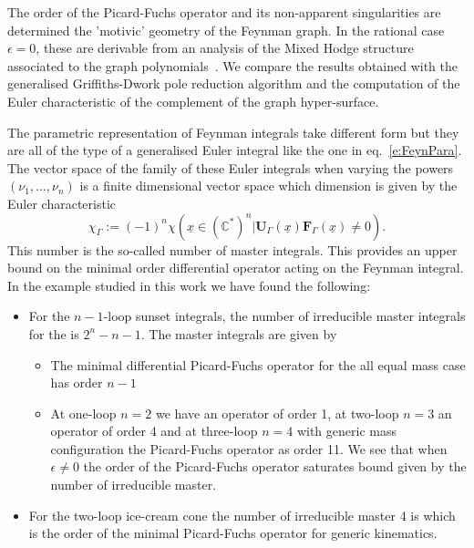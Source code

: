 \documentclass[a4paper,12pt]{article}
\numberwithin{equation}{section}
\numberwithin{figure}{section}
\begin{document}
The order of the Picard-Fuchs operator and its non-apparent
singularities are determined  the 'motivic' geometry of the Feynman
graph. In the rational case $\epsilon=0$, these are derivable from an
analysis of the Mixed Hodge structure associated to the graph
polynomials~\cite{bek,Brown:2009ta,Doran:2023yzu}.
We compare the results obtained with the generalised Griffiths-Dwork
pole reduction
algorithm and the computation of the Euler characteristic of the
complement of the graph hyper-surface.

The parametric representation of Feynman integrals take different form
but they are all of the type of a generalised Euler integral like the
one in eq.~\eqref{e:FeynPara}. The vector space of the family of these
Euler integrals when varying the powers $(\nu_1,\dots,\nu_n)$ is a
finite dimensional vector space which dimension is given by the Euler
characteristic~\cite{Lee:2013hzt,Bitoun:2017nre,Agostini:2022cgv}
\begin{equation}\label{e:chiGamma}
	\chi_\Gamma:=(-1)^n \chi\left(\underline x\in(\mathbb C^*)^n|
	\textbf{U}_\Gamma(\underline x)\textbf{F}_\Gamma(\underline
	x)\neq0\right).
\end{equation} This number is the so-called number of master
integrals. This provides an upper bound on the minimal order
differential operator acting on the Feynman integral. In the example
studied in this work we have found the following:

\begin{itemize}
	\item  For the $n-1$-loop
	sunset integrals, the number of irreducible master integrals for the
	is $2^{n}-n-1$.  The master integrals are given by
	
	\begin{itemize}  \item The minimal differential Picard-Fuchs operator for the all
		equal mass case has order  $n-1$
		\item At one-loop $n=2$ we have an operator of order 1, at two-loop
		$n=3$ an operator of order 4 and at three-loop $n=4$ with generic
		mass configuration the Picard-Fuchs operator
		as   order 11.  We see that when $\epsilon\neq0$  the order of the
		Picard-Fuchs operator saturates bound given by the number of
		irreducible master.
	\end{itemize}
	\item For the two-loop ice-cream cone the number of irreducible
	master 4 is which is the order of the minimal Picard-Fuchs
	operator for generic kinematics.
\end{itemize}
\end{document}
